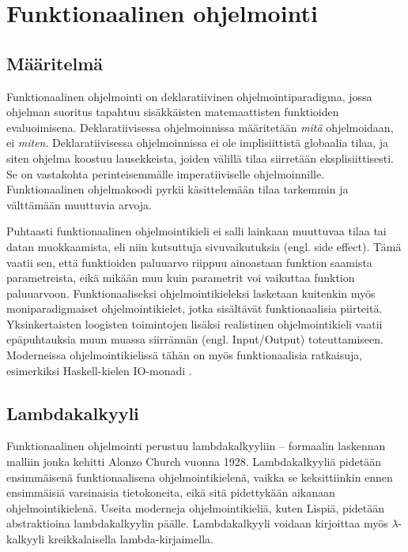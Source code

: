 \chapter{Funktionaalinen ohjelmointi} \label{Funktionaalinen ohjelmointi}

\section{Määritelmä}
Funktionaalinen ohjelmointi on deklaratiivinen ohjelmointiparadigma, jossa ohjelman suoritus tapahtuu sisäkkäisten
matemaattisten funktioiden evaluoimisena. Dek\-laratiivisessa ohjelmoinnissa määritetään \textit{mitä} ohjelmoidaan, ei
\textit{miten}. Deklaratiivisessa ohjelmoinnissa ei ole implisiittistä globaalia tilaa, ja siten ohjelma koostuu
lausekkeista, joiden välillä tilaa siirretään eksplisiittisesti. Se on vastakohta perinteisemmälle imperatiiviselle
ohjelmoinnille. Funktionaalinen ohjelmakoodi pyrkii käsittelemään tilaa tarkemmin ja välttämään muuttuvia arvoja.
\cite{hudak}

Puhtaasti funktionaalinen ohjelmointikieli ei salli lainkaan muuttuvaa tilaa tai datan muokkaamista, eli niin kutsuttuja
sivuvaikutuksia (engl. side effect). Tämä vaatii sen, että funktioiden paluuarvo riippuu ainoastaan funktion saamista
parametreista, eikä mikään muu kuin parametrit voi vaikuttaa funktion paluuarvoon. Funktionaaliseksi ohjelmointikieleksi
lasketaan kuitenkin myös moniparadigmaiset ohjelmointikielet, jotka sisältävät funktionaalisia piirteitä.
Yksinkertaisten loogisten toimintojen lisäksi realistinen ohjelmointikieli vaatii epäpuhtauksia muun muassa siirrännän
(engl. Input/Output) toteuttamiseen. \cite{purelyFunctional} Moderneissa ohjelmointikielissä tähän on myös
funktionaalisia ratkaisuja, esimerkiksi Haskell-kielen IO-monadi \cite{learnhaskell}.

\section{Lambdakalkyyli}
Funktionaalinen ohjelmointi perustuu lambdakalkyyliin – formaalin laskennan malliin jonka kehitti Alonzo Church vuonna
1928. Lambdakalkyyliä pidetään ensimmäisenä funktionaalisena ohjelmointikielenä, vaikka se keksittiinkin ennen
ensimmäisiä varsinaisia tietokoneita, eikä sitä pidettykään aikanaan ohjelmointikielenä. Useita moderneja
ohjelmointikieliä, kuten Lispiä, pidetään abstraktioina lambdakalkyylin päälle. Lambdakalkyyli voidaan kirjoittaa myös
$ \lambda $-kalkyyli kreikkalaisella lambda-kirjaimella. \cite{hudak}

